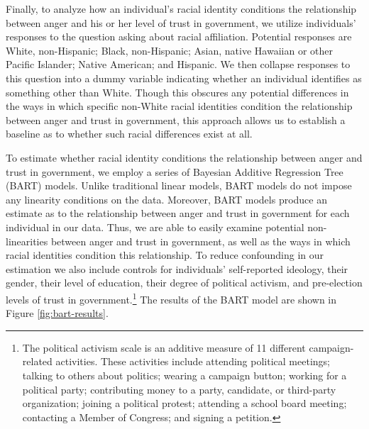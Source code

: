 \documentclass[12pt, letterpaper]{article}
\begin{document}
Finally, to analyze how an individual's racial identity conditions the relationship between anger and his or her level of trust in government, we utilize individuals' responses to the question asking about racial affiliation. Potential responses are White, non-Hispanic; Black, non-Hispanic; Asian, native Hawaiian or other Pacific Islander; Native American; and Hispanic. We then collapse responses to this question into a dummy variable indicating whether an individual identifies as something other than White. Though this obscures any potential differences in the ways in which specific non-White racial identities condition the relationship between anger and trust in government, this approach allows us to establish a baseline as to whether such racial differences exist at all.

To estimate whether racial identity conditions the relationship between anger and trust in government, we employ a series of Bayesian Additive Regression Tree (BART) models. Unlike traditional linear models, BART models do not impose any linearity conditions on the data. Moreover, BART models produce an estimate as to the relationship between anger and trust in government for each individual in our data. Thus, we are able to easily examine potential non-linearities between anger and trust in government, as well as the ways in which racial identities condition this relationship. To reduce confounding in our estimation we also include controls for individuals' self-reported ideology, their gender, their level of education, their degree of political activism, and pre-election levels of trust in government.\footnote{The political activism scale is an additive measure of 11 different campaign-related activities. These activities include attending political meetings; talking to others about politics; wearing a campaign button; working for a political party; contributing money to a party, candidate, or third-party organization; joining a political protest; attending a school board meeting; contacting a Member of Congress; and signing a petition.} The results of the BART model are shown in Figure \ref{fig:bart-results}.
\end{document}
